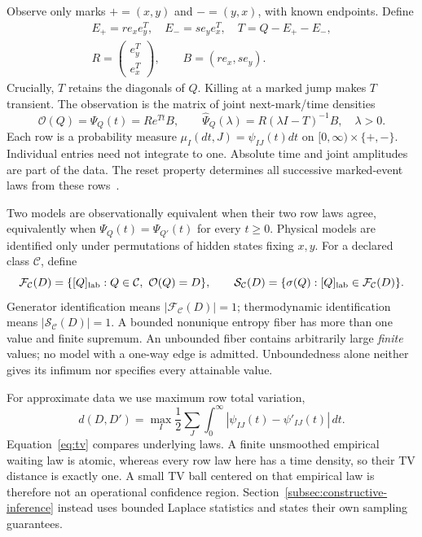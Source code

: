 \documentclass[aps,pre,onecolumn,11pt,longbibliography,notitlepage]{revtex4-2}
\newcommand{\1}{\mathbf 1}
\newcommand{\C}{\mathcal C}
\newcommand{\Obs}{\mathcal O}
\newcommand{\F}{\mathcal F}
\newcommand{\Ent}{\mathcal S}
\newcommand{\sig}{\sigma}
\begin{document}
Observe only marks $+=(x,y)$ and $-=(y,x)$, with known endpoints. Define
\begin{gather}
 E_+=r e_xe_y^T,\quad E_-=s e_ye_x^T,\quad T=Q-E_+-E_-,\\
 R=\begin{pmatrix}e_y^T\\e_x^T\end{pmatrix},\qquad B=(r e_x,s e_y).
\end{gather}
Crucially, $T$ retains the diagonals of $Q$. Killing at a marked jump makes $T$ transient. The observation is the matrix of joint next-mark/time densities
\begin{equation}
 \Obs(Q)=\Psi_Q(t)=R e^{Tt}B,\qquad
 \widehat\Psi_Q(\lambda)=R(\lambda I-T)^{-1}B,\quad\lambda>0.\label{eq:obs}
\end{equation}
Each row is a probability measure $\mu_I(dt,J)=\psi_{IJ}(t)dt$ on $[0,\infty)\times\{+,-\}$. Individual entries need not integrate to one. Absolute time and joint amplitudes are part of the data. The reset property determines all successive marked-event laws from these rows~\cite{vanDerMeer2022,Harunari2022}.

Two models are observationally equivalent when their two row laws agree, equivalently when $\Psi_Q(t)=\Psi_{Q'}(t)$ for every $t\ge0$. Physical models are identified only under permutations of hidden states fixing $x,y$. For a declared class $\C$, define
\begin{equation}
 \F_{\C}(D)=\{[Q]_{\rm lab}:Q\in\C,\ \Obs(Q)=D\},\qquad
 \Ent_{\C}(D)=\{\sig(Q):[Q]_{\rm lab}\in\F_{\C}(D)\}.\label{eq:fibers}
\end{equation}
Generator identification means $|\F_\C(D)|=1$; thermodynamic identification means $|\Ent_\C(D)|=1$. A bounded nonunique entropy fiber has more than one value and finite supremum. An unbounded fiber contains arbitrarily large \emph{finite} values; no model with a one-way edge is admitted. Unboundedness alone neither gives its infimum nor specifies every attainable value.

For approximate data we use maximum row total variation,
\begin{equation}
 d(D,D')=\max_I\frac12\sum_J\int_0^\infty
 |\psi_{IJ}(t)-\psi'_{IJ}(t)|\,dt.\label{eq:tv}
\end{equation}
Equation~\eqref{eq:tv} compares underlying laws. A finite unsmoothed empirical waiting law is atomic, whereas every row law here has a time density, so their TV distance is exactly one. A small TV ball centered on that empirical law is therefore not an operational confidence region. Section~\ref{subsec:constructive-inference} instead uses bounded Laplace statistics and states their own sampling guarantees.
\end{document}
